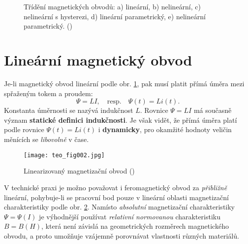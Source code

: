   
    \begin{figure}[ht!]  %
      \centering
       \\
       \\
      \caption{Třídění magnetických obvodů: a) lineární, b) nelineární, c) nelineární s hysterezi,
               d) lineární parametrický, e) nelineární parametrický.
               (\cite[s.~150]{Patocka4})}
      \label{teo:fig001}
    \end{figure}
    
  \section{Lineární magnetický obvod}\label{teo:IchapVsecII}
    Je-li magnetický obvod lineární podle obr. \ref{teo:fig001}, pak musí platit přímá úměra mezi 
    spřaženým tokem a proudem:
    \begin{equation}\label{TEO:eq001}
      \Psi    = LI, \quad\text{resp.}\quad
      \Psi(t) = Li(t).
    \end{equation}
    Konstanta úměrnosti se nazývá indukčnost \(L\). Rovnice \(\Psi=LI\) má současně význam 
    \textbf{statické definici indukčnosti}. Je však vidět, že přímá úměra platí podle rovnice 
    \(\Psi(t) = Li(t)\) i \textbf{dynamicky}, pro okamžité hodnoty veličin měnících se 
    \emph{libovolně} v čase.
    
    \begin{figure}[ht!]  %
      \centering
      \texttt{[image: teo\_fig002.jpg]}
      \caption{Linearizovaný magnetizační obvod
              (\cite[s.~151]{Patocka4})}
      \label{teo:fig002}
    \end{figure}
    
    V technické praxi je možno považovat i feromagnetický obvod za \emph{přibližně} lineární, 
    pohybuje-li se pracovní bod pouze v lineární oblasti magnetizační charakteristiky podle obr. 
    \ref{teo:fig002}. Namísto \emph{absolutní} magnetizační charakteristiky \(\Psi = \Psi(I)\) je 
    výhodnější používat \emph{relativní normovanou} charakteristiku  \(B= B(H)\), která není 
    závislá na geometrických rozměrech magnetického obvodu, a proto umožňuje vzájemně porovnávat 
    vlastnosti různých materiálů.

